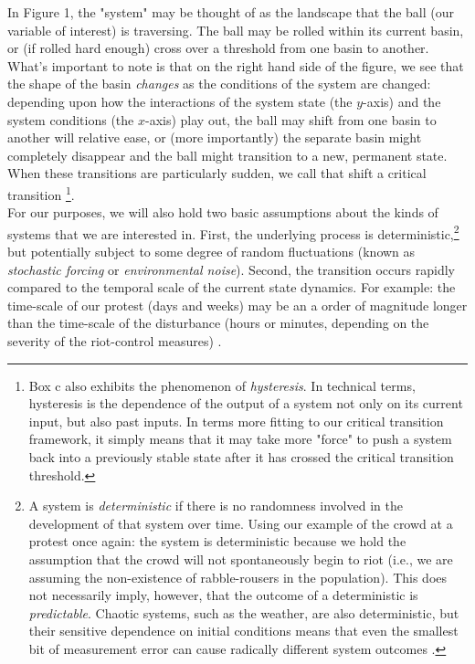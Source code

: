 \documentclass[12pt]{article}
\begin{document}
In Figure 1, the "system" may be thought of as the landscape that the ball (our variable of interest) is traversing. The ball may be rolled within its current basin, or (if rolled hard enough) cross over a threshold from one basin to another. What's important to note is that on the right hand side of the figure, we see that the shape of the basin \emph{changes} as the conditions of the system are changed: depending upon how the interactions of the system state (the $y$-axis) and the system conditions (the $x$-axis) play out, the ball may shift from one basin to another will relative ease, or (more importantly) the separate basin might completely disappear and the ball might transition to a new, permanent state. When these transitions are particularly sudden, we call that shift a critical transition \footnote{Box c also exhibits the phenomenon of \emph{hysteresis}. In technical terms, hysteresis is the dependence of the output of a system not only on its current input, but also past inputs. In terms more fitting to our critical transition framework, it simply means that it may take more "force" to push a system back into a previously stable state after it has crossed the critical transition threshold.}. \\

For our purposes, we will also hold two basic assumptions about the kinds of systems that we are interested in. First, the underlying process is deterministic,\footnote{A system is \emph{deterministic} if there is no randomness involved in the development of that system over time. Using our example of the crowd at a protest once again: the system is deterministic because we hold the assumption that the crowd will not spontaneously begin to riot (i.e., we are assuming the non-existence of rabble-rousers in the population). This does not necessarily imply, however, that the outcome of a deterministic is \emph{predictable}. Chaotic systems, such as the weather, are also deterministic, but their sensitive dependence on initial conditions means that even the smallest bit of measurement error can cause radically different system outcomes \cite{Strogatz2000}.} but potentially subject to some degree of random fluctuations (known as \emph{stochastic forcing} or \emph{environmental noise}). Second, the transition occurs rapidly compared to the temporal scale of the current state dynamics. For example: the time-scale of our protest (days and weeks) may be an a order of magnitude longer than the time-scale of the disturbance (hours or minutes, depending on the severity of the riot-control measures) \cite{Kuehn2013}. \\
\end{document}
